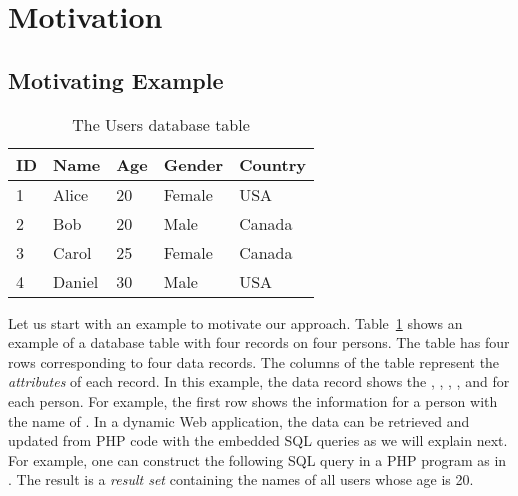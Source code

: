 \section{Motivation}

\subsection{Motivating Example}

\begin{table}
    \centering
    \small
    \caption{The \textsf{Users} database table}\label{tab:users-table}
\begin{tabular}{lllll}
  \addlinespace
  \toprule
  \textbf{ID} & \textbf{Name} & \textbf{Age} & \textbf{Gender} & \textbf{Country} \\
  \midrule
  1 & Alice & 20 & Female & USA \\
  2 & Bob & 20 & Male & Canada \\
  3 & Carol & 25 & Female & Canada \\
  4 & Daniel & 30 & Male & USA \\
  \bottomrule
\end{tabular}
\end{table}

Let us start with an example to motivate our
approach. Table~\ref{tab:users-table} shows an example of a database
table with four records on four persons. The table  has
four rows corresponding to four data records. The columns of the table
represent the {\em attributes} of each record. In this example, the
data record shows the , , ,
, and  for each person. For example, the
first row shows the information for a person with the name of
. In a dynamic Web application, the data can be retrieved
and updated from PHP code with the embedded SQL queries as we will
explain next. For example, one can construct the following SQL query
in a PHP program as in . The result is a {\em result set} containing the names of all
users whose age is 20.


